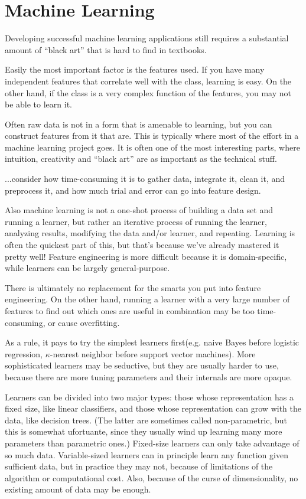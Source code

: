 \section{Machine Learning}
Developing successful machine learning applications still requires a substantial amount of “black art” that is hard to find in textbooks.\cite{Domingos2012}

Easily the most important factor is the features used. If you have many independent features that correlate well with the class, learning is easy. On the other hand, if the class is a very complex function of the features, you may not be able to learn it.\cite{Domingos2012}

Often raw data is not in a form that is amenable to learning, but you can construct features from it that are. This is typically where most of the effort in a machine learning project goes. It is often one of the most interesting parts, where intuition, creativity and “black art” are as important as the technical stuff.\cite{Domingos2012}

...consider how time-consuming it is to gather data, integrate it, clean it, and preprocess it, and how much trial and error can go into feature design.\cite{Domingos2012}

Also machine learning is not a one-shot process of building a data set and running a learner, but rather an iterative process of running the learner, analyzing results, modifying the data and/or learner, and repeating. Learning is often the quickest part of this, but that’s because we’ve already mastered it pretty well! Feature engineering is more difficult because it is domain-specific, while learners can be largely general-purpose.\cite{Domingos2012}

There is ultimately no replacement for the smarts you put into feature engineering. On the other hand, running a learner with a very large number of features to find out which ones are useful in combination may be too time-consuming, or cause overfitting.\cite{Domingos2012}

As a rule, it pays to try the simplest learners first(e.g. naive Bayes before logistic regression, $\kappa$-nearest neighbor before support vector machines). More sophisticated learners may be seductive, but they are usually harder to use, because there are more tuning parameters and their internals are more opaque.\cite{Domingos2012}

Learners can be divided into two major types: those whose representation has a fixed size, like linear classifiers, and those whose representation can grow with the data, like decision trees. (The latter are sometimes called non-parametric, but this is somewhat ufortuante, since they usually wind up learning many more parameters than parametric ones.) Fixed-size learners can only take advantage of so much data. Variable-sized learners can in principle learn any function given sufficient data, but in practice they may not, because of limitations of the algorithm or computational cost. Also, because of the curse of dimensionality, no existing amount of data may be enough.\cite{Domingos2012}

